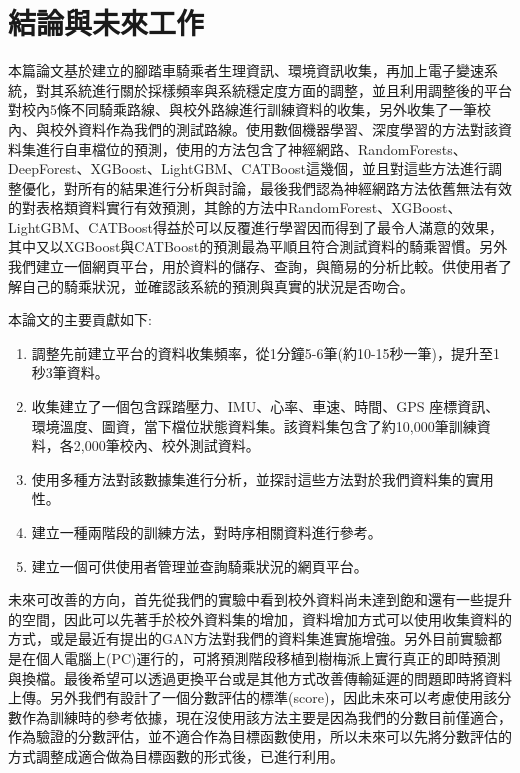 \chapter{結論與未來工作}
本篇論文基於\cite{9026293}建立的腳踏車騎乘者生理資訊、環境資訊收集，再加上電子變速系統，對其系統進行關於採樣頻率與系統穩定度方面的調整，並且利用調整後的平台對校內5條不同騎乘路線、與校外路線進行訓練資料的收集，另外收集了一筆校內、與校外資料作為我們的測試路線。使用數個機器學習、深度學習的方法對該資料集進行自車檔位的預測，使用的方法包含了神經網路、RandomForests、DeepForest、XGBoost、LightGBM、CATBoost這幾個，並且對這些方法進行調整優化，對所有的結果進行分析與討論，最後我們認為神經網路方法依舊無法有效的對表格類資料實行有效預測，其餘的方法中RandomForest、XGBoost、LightGBM、CATBoost得益於可以反覆進行學習因而得到了最令人滿意的效果，其中又以XGBoost與CATBoost的預測最為平順且符合測試資料的騎乘習慣。另外我們建立一個網頁平台，用於資料的儲存、查詢，與簡易的分析比較。供使用者了解自己的騎乘狀況，並確認該系統的預測與真實的狀況是否吻合。


本論文的主要貢獻如下:
\begin{enumerate}
	\item 調整先前建立平台的資料收集頻率，從1分鐘5-6筆(約10-15秒一筆)，提升至1秒3筆資料。
	\item 收集建立了一個包含踩踏壓力、IMU、心率、車速、時間、GPS 座標資訊、環境溫度、圖資，當下檔位狀態資料集。該資料集包含了約10,000筆訓練資料，各2,000筆校內、校外測試資料。
	\item 使用多種方法對該數據集進行分析，並探討這些方法對於我們資料集的實用性。
	\item 建立一種兩階段的訓練方法，對時序相關資料進行參考。
	\item 建立一個可供使用者管理並查詢騎乘狀況的網頁平台。
\end{enumerate}

未來可改善的方向，首先從我們的實驗中看到校外資料尚未達到飽和還有一些提升的空間，因此可以先著手於校外資料集的增加，資料增加方式可以使用收集資料的方式，或是最近有提出的GAN方法對我們的資料集進實施增強。另外目前實驗都是在個人電腦上(PC)運行的，可將預測階段移植到樹梅派上實行真正的即時預測與換檔。最後希望可以透過更換平台或是其他方式改善傳輸延遲的問題即時將資料上傳。另外我們有設計了一個分數評估的標準(score)，因此未來可以考慮使用該分數作為訓練時的參考依據，現在沒使用該方法主要是因為我們的分數目前僅適合，作為驗證的分數評估，並不適合作為目標函數使用，所以未來可以先將分數評估的方式調整成適合做為目標函數的形式後，已進行利用。